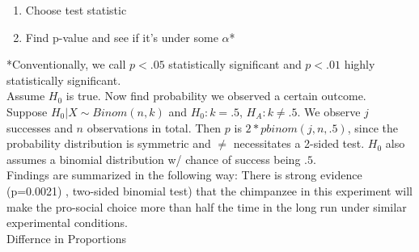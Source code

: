 \documentclass[10pt,landscape]{article}
\begin{document}
\begin{multicols}{3}
\begin{enumerate}
        \item Choose test statistic 
        \item Find p-value and see if it's under some $\alpha$*
\end{enumerate}
*Conventionally, we call $p < .05$ statistically significant and $p<.01$ highly statistically significant. \\
Assume $H_0$ is true. Now find probability we observed a certain outcome. \\
Suppose $H_0 | X \sim Binom(n, k)$ and $H_0: k = .5$, $H_A: k \ne .5$. 
We observe $j$ successes and $n$ observations in total. Then $p$ is $2 * pbinom(j, n, .5)$, 
since the probability distribution is symmetric and $\ne$ necessitates a 2-sided test. 
$H_0$ also assumes a binomial distribution w/ chance of success being $.5$. \\
Findings are summarized in the following way: There is strong evidence (p=0.0021)
, two-sided binomial test) that the chimpanzee in this experiment will make the pro-social choice more than half the time in the long run under similar experimental conditions. \\
Differnce in Proportions\\
\begin{tabular}{@{}p{\the\MyLen}%
        @{}p{\linewidth-\the\MyLen}@{}}


\end{tabular}
\end{multicols}
\end{document}

